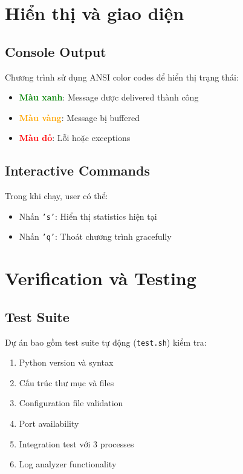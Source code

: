 \section{Hiển thị và giao diện}

\subsection{Console Output}

Chương trình sử dụng ANSI color codes để hiển thị trạng thái:

\begin{itemize}
    \item \textcolor{green}{\textbf{Màu xanh}}: Message được delivered thành công
    \item \textcolor{orange}{\textbf{Màu vàng}}: Message bị buffered
    \item \textcolor{red}{\textbf{Màu đỏ}}: Lỗi hoặc exceptions
\end{itemize}

\subsection{Interactive Commands}

Trong khi chạy, user có thể:
\begin{itemize}
    \item Nhấn \texttt{'s'}: Hiển thị statistics hiện tại
    \item Nhấn \texttt{'q'}: Thoát chương trình gracefully
\end{itemize}

\section{Verification và Testing}

\subsection{Test Suite}

Dự án bao gồm test suite tự động (\texttt{test.sh}) kiểm tra:

\begin{enumerate}
    \item Python version và syntax
    \item Cấu trúc thư mục và files
    \item Configuration file validation
    \item Port availability
    \item Integration test với 3 processes
    \item Log analyzer functionality
\end{enumerate}

